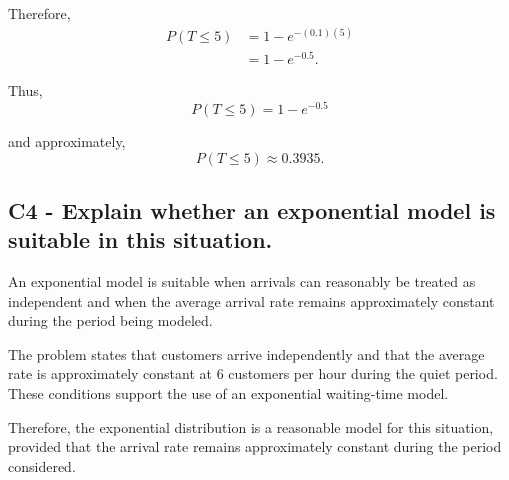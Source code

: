 {	Therefore,
	\[
	\begin{aligned}
		P(T\le5)
		&=1-e^{-(0.1)(5)}\\
		&=1-e^{-0.5}.
	\end{aligned}
	\]
	
	Thus,
	\[
	\boxed{
		P(T\le5)=1-e^{-0.5}
	}
	\]
	
	and approximately,
	\[
	P(T\le5)\approx0.3935.
	\]
	

	\label{subsec:customer-arrival-waiting-time-c4-c}
	\subsection*{C4 - Explain whether an exponential model is suitable in this situation. }
	
	An exponential model is suitable when arrivals can reasonably be treated as independent and when the average arrival rate remains approximately constant during the period being modeled.
	
	The problem states that customers arrive independently and that the average rate is approximately constant at $6$ customers per hour during the quiet period. These conditions support the use of an exponential waiting-time model.
	
	Therefore, the exponential distribution is a reasonable model for this situation, provided that the arrival rate remains approximately constant during the period considered.
	

	}

